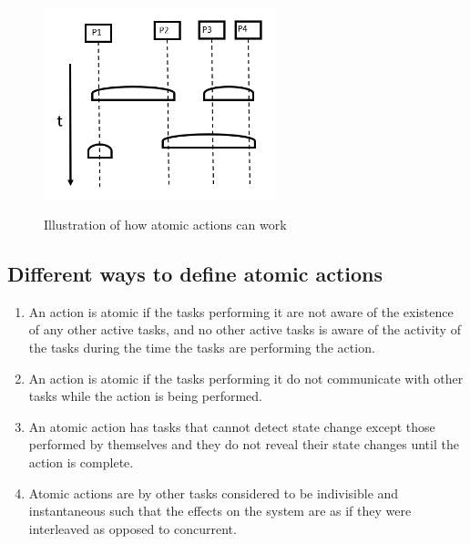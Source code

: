 \begin{figure}[H]
\centering
\includegraphics[width=0.6\textwidth]{figures/Fault_Tolerance/atomic_actions.PNG}
\label{fig: atomic_actions}
\caption{Illustration of how atomic actions can work}
\end{figure}

\subsection{Different ways to define atomic actions }
\begin{enumerate}
\item An action is atomic if the tasks performing it are not aware of the existence of any other active tasks, and no other active tasks is aware of the activity of the tasks during the time the tasks are performing the action. 
\item An action is atomic if the tasks performing it do not communicate with other tasks while the action is being performed.
\item An atomic action has tasks that cannot detect state change except those performed by themselves and they do not reveal their state changes until the action is complete.
\item Atomic actions are by other tasks considered to be indivisible and instantaneous such that the effects on the system are as if they were interleaved as opposed to concurrent.  
\end{enumerate}

